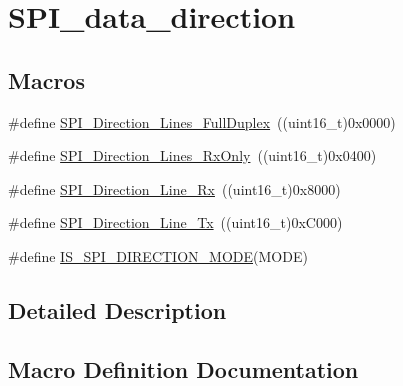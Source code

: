 \hypertarget{group___s_p_i__data__direction}{}\section{S\+P\+I\+\_\+data\+\_\+direction}
\label{group___s_p_i__data__direction}
\subsection*{Macros}
\begin{DoxyCompactItemize}
\item 
\#define \mbox{\hyperlink{group___s_p_i__data__direction_gab6bdb82e315a90210c4425c46bbdf5f1}{S\+P\+I\+\_\+\+Direction\+\_\+Lines\+\_\+\+Full\+Duplex}}~((uint16\+\_\+t)0x0000)
\item 
\#define \mbox{\hyperlink{group___s_p_i__data__direction_gab8ab942f7240394f50e4c86c5288516a}{S\+P\+I\+\_\+\+Direction\+\_\+Lines\+\_\+\+Rx\+Only}}~((uint16\+\_\+t)0x0400)
\item 
\#define \mbox{\hyperlink{group___s_p_i__data__direction_ga42ea8306cfc1f23ffc51efae6f66320e}{S\+P\+I\+\_\+\+Direction\+\_\+Line\+\_\+\+Rx}}~((uint16\+\_\+t)0x8000)
\item 
\#define \mbox{\hyperlink{group___s_p_i__data__direction_ga70cc710a771065b2ed11c2ac9697defe}{S\+P\+I\+\_\+\+Direction\+\_\+Line\+\_\+\+Tx}}~((uint16\+\_\+t)0x\+C000)
\item 
\#define \mbox{\hyperlink{group___s_p_i__data__direction_ga536857c68ce1d9806c04046707448b3e}{I\+S\+\_\+\+S\+P\+I\+\_\+\+D\+I\+R\+E\+C\+T\+I\+O\+N\+\_\+\+M\+O\+DE}}(M\+O\+DE)
\end{DoxyCompactItemize}


\subsection{Detailed Description}


\subsection{Macro Definition Documentation}
\mbox{\label{group___s_p_i__data__direction_ga536857c68ce1d9806c04046707448b3e}} 
